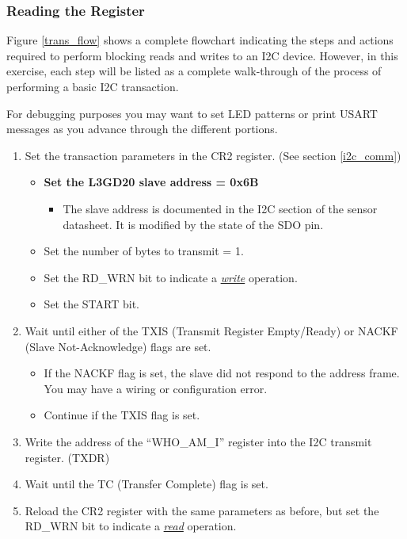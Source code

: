 \documentclass[openany,11pt,fleqn]{book} %
\begin{document}
\begin{exercise}
\subsubsection{Reading the Register}
Figure \ref{trans_flow} shows a complete flowchart indicating the steps and actions required to perform blocking reads and writes to an I2C device. However, in this exercise, each step will be listed as a complete walk-through of the process of performing a basic I2C transaction. 

For debugging purposes you may want to set LED patterns or print USART messages as you advance through the different portions.

\begin{enumerate}
    \item Set the transaction parameters in the CR2 register. (See section \ref{i2c_comm})
    \begin{itemize}
        \item \textbf{Set the L3GD20 slave address = 0x6B}
        \begin{itemize}
            \item The slave address is documented in the I2C section of the sensor datasheet. It is modified by the state of the SDO pin.
        \end{itemize}
        \item Set the number of bytes to transmit = 1.
        \item Set the RD\_WRN bit to indicate a \underline{\textit{write}} operation.
        \item Set the START bit.
    \end{itemize}
    \item Wait until either of the TXIS (Transmit Register Empty/Ready) or NACKF (Slave Not-Acknowledge) flags are set.
    \begin{itemize}
        \item If the NACKF flag is set, the slave did not respond to the address frame. You may have a wiring or configuration error. 
        \item Continue if the TXIS flag is set. 
    \end{itemize}
    \item Write the address of the ``WHO\_AM\_I'' register into the I2C transmit register. (TXDR)
    \item Wait until the TC (Transfer Complete) flag is set.
    \item Reload the CR2 register with the same parameters as before, but set the RD\_WRN bit to indicate a \underline{\textit{read}} operation.

\end{enumerate}
\end{exercise}
\end{document}
